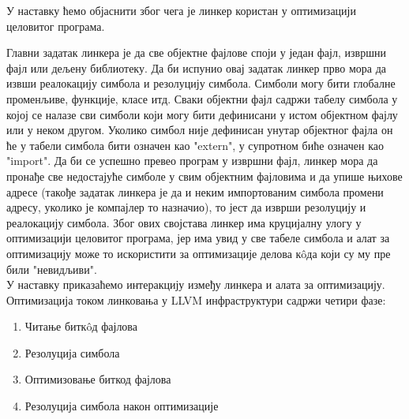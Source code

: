 \documentclass[12pt,oneside]{memoir}
\begin{document}
У наставку ћемо објаснити због чега је линкер користан у оптимизацији целовитог програма.

Главни задатак линкера је да све објектне фајлове споји у један фајл, извршни фајл
или дељену библиотеку. 
Да би испунио овај задатак линкер прво мора да извши реалокацију симбола и резолуцију
симбола.
Симболи могу бити глобалне променљиве, функције, класе итд. 
Сваки објектни фајл садржи табелу симбола у којој се налазе сви симболи који 
могу бити дефинисани у истом објектном фајлу или у неком другом.
Уколико симбол није дефинисан унутар објектног фајла он ће у табели симбола бити
означен као "extern", у супротном биће означен као "import".
Да би се успешно превео програм у извршни фајл, линкер мора да пронађе све 
недостајуће симболе у свим објектним фајловима и да упише њихове адресе (такође задатак
линкера је да и неким импортованим симбола промени адресу, уколико је компајлер то назначио),
то јест да изврши резолуцију и реалокацију симбола.
Због ових својстава линкер има круцијалну улогу у оптимизацији целовитог програма, јер
има увид у све табеле симбола и алат за оптимизацију може то искористити за оптимизације
делова к\^{o}да који су му пре били "невидљиви". 
\\
У наставку приказаћемо интеракцију између линкера и алата за оптимизацију.
Оптимизација током линковања у LLVM инфраструктури садржи четири фазе:
\begin{enumerate}
\item Читање битк\^{o}д фајлова
\item Резолуција симбола
\item Оптимизовање биткод фајлова
\item Резолуција симбола након оптимизације
\end{enumerate}
\end{document}
